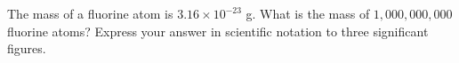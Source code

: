 The mass of a fluorine atom is $3.16\times10^{-23}$ g. What is the mass of $1{,}000{,}000{,}000$ fluorine atoms? Express your answer in scientific notation to three significant figures.
